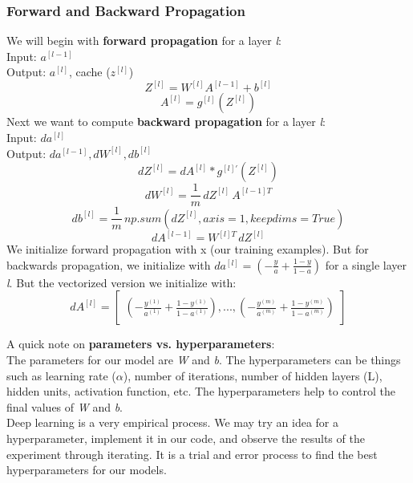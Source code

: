 \documentclass[11pt, a4paper]{article}
\begin{document}
\begin{spacing}{1.1}
	\subsubsection{Forward and Backward Propagation}
	We will begin with \textbf{forward propagation} for a layer \textit{l}: \vspace*{1mm} \\
	\hspace*{5mm} Input: $a^{[l-1]}$ \\
	\hspace*{5mm} Output: $a^{[l]}$, cache ($z^{[l]}$)
	$$ Z^{[l]} = W^{[l]}A^{[l-1]}+b^{[l]}$$ $$ A^{[l]} = g^{[l]}(Z^{[l]})$$ 
	Next we want to compute \textbf{backward propagation} for a layer \textit{l}: \vspace*{1mm} \\
	\hspace*{5mm} Input: $da^{[l]}$ \\
	\hspace*{5mm} Output: $da^{[l-1]}, dW^{[l]}, db^{[l]}$
	$$dZ^{[l]} = dA^{[l]}* g^{[l]\prime}(Z^{[l]})$$ $$ dW^{[l]} = \frac{1}{m}\, dZ^{[l]}\, A^{[l-1]T}$$ $$ db^{[l]} = \frac{1}{m}\, np.sum(dZ^{[l]}, axis=1, keepdims=True)$$ $$ dA^{[l-1]} = W^{[l]T}\,dZ^{[l]}$$ 
	We initialize forward propagation with x (our training examples). But for backwards propagation, we initialize with $da^{[l]} = (-\frac{y}{a} + \frac{1-y}{1-a})$ for a single layer \textit{l}. But the vectorized version we initialize with: $$ dA^{[l]} = \begin{bmatrix} (-\frac{y^{(1)}}{a^{(1)}} + \frac{1-y^{(1)}}{1-a^{(1)}}),..., (-\frac{y^{(m)}}{a^{(m)}} + \frac{1-y^{(m)}}{1-a^{(m)}}) \end{bmatrix}  $$ \newpage

	\noindent A quick note on \textbf{parameters vs. hyperparameters}: \vspace*{1mm} \\
	The parameters for our model are \textit{W} and \textit{b}. The hyperparameters can be things such as learning rate ($\alpha$), number of iterations, number of hidden layers (L), hidden units, activation function, etc. The hyperparameters help to control the final values of \textit{W} and \textit{b}. \vspace*{2mm}\\
	Deep learning is a very empirical process. We may try an idea for a hyperparameter, implement it in our code, and observe the results of the experiment through iterating. It is a trial and error process to find the best hyperparameters for our models. 
	

\end{spacing}
\end{document}
